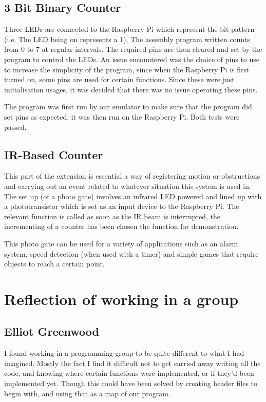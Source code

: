 \documentclass[11pt]{article}
\begin{document}
\subsection{3 Bit Binary Counter}
 Three LEDs are connected to the Raspberry Pi which represent the bit pattern (i.e. The LED being on represents a 1). The assembly program written counts from 0 to 7 at regular intervals. The required pins are then cleared and set by the program to control the LEDs. An issue encountered was the choice of pins to use to increase the simplicity of the program, since when the Raspberry Pi is first turned on, some pins are used for certain functions. Since these were just initialisation usages, it was decided that there was no issue operating these pins.

 The program was first run by our emulator to make sure that the program did set pins as expected, it was then run on the Raspberry Pi. Both tests were passed.

\subsection{IR-Based Counter}
This part of the extension is essential a way of registering motion or obstructions and carrying out an event related to whatever situation this system is used in. The set up (of a photo gate) involves an infrared LED powered and lined up with a phototransistor which is set as an input device to the Raspberry Pi. The relevant function is called as soon as the IR beam is interrupted, the incrementing of a counter has been chosen the function for demonstration.\newline

\noindent This photo gate can be used for a variety of applications such as an alarm system, speed detection (when used with a timer) and simple games that require objects to reach a certain point.\newline



\section{Reflection of working in a group}
\subsection{Elliot Greenwood}

I found working in a programming group to be quite different to what I had imagined. Mostly the fact I find it difficult not to get carried away writing all the code, and knowing where certain functions were implemented, or if they'd been implemented yet. Though this could have been solved by creating header files to begin with, and using that as a map of our program. \newline
\end{document}
